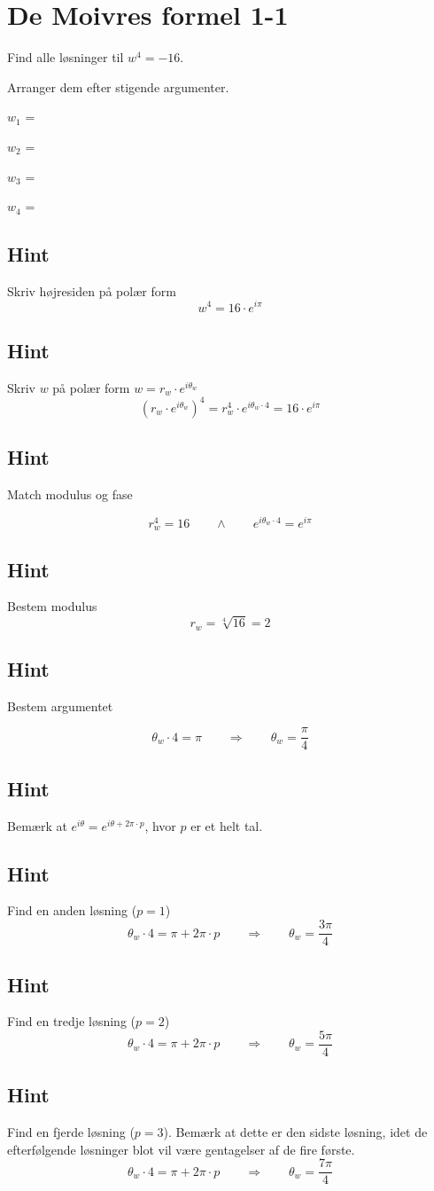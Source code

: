 \documentclass{article}
\newenvironment{exercise}[1]{\newpage\section{#1}}{}
\newcommand{\answerbox}[1]{\fbox{$#1$}}
\newcommand{\hint}{\subsection*{Hint}}
\begin{document}
\tableofcontents
\newpage

\begin{exercise}{De Moivres formel 1-1}

Find alle løsninger til $w^4=-16$. 

Arranger dem efter stigende argumenter.

$w_1$ = \answerbox{2 \cdot e^{i \frac{\pi}{4}}}		

$w_2$ = \answerbox{2 \cdot e^{i \frac{3 \pi}{4}}}		

$w_3$ = \answerbox{2 \cdot e^{i \frac{5 \pi}{4}}}		

$w_4$ = \answerbox{2 \cdot e^{i \frac{7 \pi}{4}}}


\hint 

Skriv højresiden på polær form
\[
w^4 = 16 \cdot e^{i \pi}
\]


\hint

Skriv $w$ på polær form $w = r_w \cdot e^{i \theta_w}$
\[
\left(r_w \cdot e^{i \theta_w}\right)^4 = r_w^4 \cdot e^{i \theta_w \cdot 4} = 16 \cdot e^{i \pi}
\]

\hint 
Match modulus og fase

\[
r_w^4 = 16 \qquad \wedge \qquad e^{i \theta_w \cdot 4} = e^{i \pi}
\]

\hint

Bestem modulus
\[
r_w  =  \sqrt[4]{16} = 2
\]

\hint

Bestem argumentet

\[
\theta_w \cdot 4 = \pi \qquad \Rightarrow \qquad  \theta_w = \frac{\pi}{4}
\]

\hint

Bemærk at $e^{i \theta} = e^{i \theta + 2 \pi \cdot p}$, hvor $p$ er et helt tal.

\hint

Find en anden løsning ($p=1$)
\[
\theta_w \cdot 4 = \pi  + 2 \pi \cdot p \qquad \Rightarrow \qquad  \theta_w = \frac{3 \pi}{4}
\]

\hint

Find en tredje løsning ($p=2$)
\[
\theta_w \cdot 4 = \pi  + 2 \pi \cdot p \qquad \Rightarrow  \qquad  \theta_w = \frac{5 \pi}{4}
\]

\hint

Find en fjerde løsning ($p=3$). 
Bemærk at dette er den sidste løsning, idet de efterfølgende 
løsninger blot vil være gentagelser af de fire første. 
\[
\theta_w \cdot 4 = \pi  + 2 \pi \cdot p \qquad \Rightarrow  \qquad  \theta_w = \frac{7 \pi}{4}
\]

\end{exercise}
\end{document}
